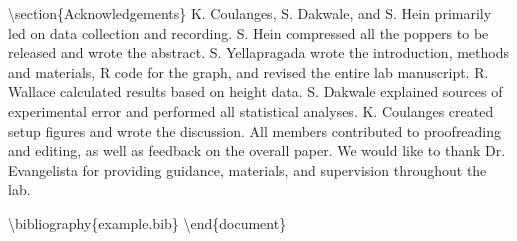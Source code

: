 \textbackslash section\{Acknowledgements\} K. Coulanges, S. Dakwale, and
S. Hein primarily led on data collection and recording. S. Hein
compressed all the poppers to be released and wrote the abstract. S.
Yellapragada wrote the introduction, methods and materials, R code for
the graph, and revised the entire lab manuscript. R. Wallace calculated
results based on height data. S. Dakwale explained sources of
experimental error and performed all statistical analyses. K. Coulanges
created setup figures and wrote the discussion. All members contributed
to proofreading and editing, as well as feedback on the overall paper.
We would like to thank Dr. Evangelista for providing guidance,
materials, and supervision throughout the lab.

\textbackslash bibliography\{example.bib\}
\textbackslash end\{document\}
